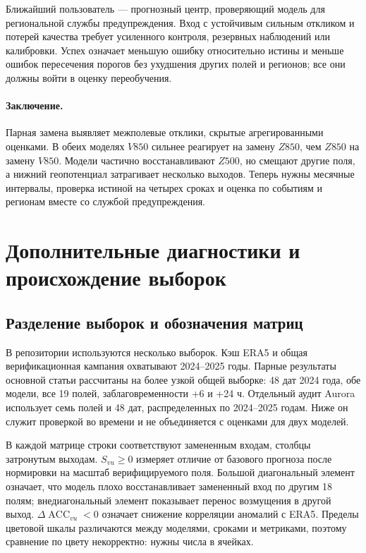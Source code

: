 \documentclass{article}
\newcommand{\acc}{\operatorname{ACC}}
\begin{document}
Ближайший пользователь --- прогнозный центр, проверяющий модель для региональной службы предупреждения. Вход с устойчивым сильным откликом и потерей качества требует усиленного контроля, резервных наблюдений или калибровки. Успех означает меньшую ошибку относительно истины и меньше ошибок пересечения порогов без ухудшения других полей и регионов; все они должны войти в оценку переобучения.

\paragraph{Заключение.} Парная замена выявляет межполевые отклики, скрытые агрегированными оценками. В обеих моделях $V850$ сильнее реагирует на замену $Z850$, чем $Z850$ на замену $V850$. Модели частично восстанавливают $Z500$, но смещают другие поля, а нижний геопотенциал затрагивает несколько выходов. Теперь нужны месячные интервалы, проверка истиной на четырех сроках и оценка по событиям и регионам вместе со службой предупреждения.

\clearpage



\clearpage
\appendix
\section{Дополнительные диагностики и происхождение выборок}
\label{app:figures}
\renewcommand{\thefigure}{A\arabic{figure}}
\renewcommand{\theHfigure}{A\arabic{figure}}
\setcounter{figure}{0}

\subsection{Разделение выборок и обозначения матриц}
\label{app:provenance}

В репозитории используются несколько выборок. Кэш ERA5 и общая верификационная кампания охватывают 2024--2025 годы. Парные результаты основной статьи рассчитаны на более узкой общей выборке: 48 дат 2024 года, обе модели, все 19 полей, заблаговременности +6 и +24 ч. Отдельный аудит Aurora использует семь полей и 48 дат, распределенных по 2024--2025 годам. Ниже он служит проверкой во времени и не объединяется с оценками для двух моделей.

В каждой матрице строки соответствуют замененным входам, столбцы затронутым выходам. $S_{vu}\geq0$ измеряет отличие от базового прогноза после нормировки на масштаб верифицируемого поля. Большой диагональный элемент означает, что модель плохо восстанавливает замененный вход по другим 18 полям; внедиагональный элемент показывает перенос возмущения в другой выход. $\Delta\acc_{vu}<0$ означает снижение корреляции аномалий с ERA5. Пределы цветовой шкалы различаются между моделями, сроками и метриками, поэтому сравнение по цвету некорректно: нужны числа в ячейках.
\end{document}

